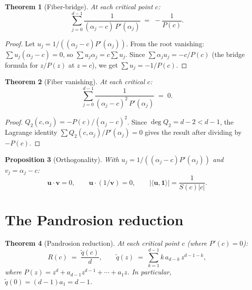 \documentclass[11pt,a4paper]{article}
\newtheorem{theorem}{Theorem}[section]
\newtheorem{proposition}[theorem]{Proposition}
\begin{document}
\begin{theorem}[Fiber-bridge]
At each critical point $c$:
\begin{equation}
\boxed{\sum_{j=0}^{d-1} \frac{1}{(\alpha_j - c)\, P'(\alpha_j)} \;=\; -\frac{1}{P(c)}.}
\end{equation}
\end{theorem}

\begin{proof}
Let $u_j = 1/((\alpha_j - c) P'(\alpha_j))$. From the root vanishing: $\sum u_j (\alpha_j - c) = 0$, so $\sum u_j \alpha_j = c \sum u_j$. Since $\sum \alpha_j u_j = -c/P(c)$ (the bridge formula for $z/P(z)$ at $z = c$), we get $\sum u_j = -1/P(c)$.
\end{proof}

\begin{theorem}[Fiber vanishing]
At each critical $c$:
\begin{equation}
\boxed{\sum_{j=0}^{d-1} \frac{1}{(\alpha_j - c)^2\, P'(\alpha_j)} \;=\; 0.}
\end{equation}
\end{theorem}

\begin{proof}
$Q_2(c, \alpha_j) = -P(c)/(\alpha_j - c)^2$. Since $\deg Q_2 = d - 2 < d - 1$, the Lagrange identity $\sum Q_2(c, \alpha_j)/P'(\alpha_j) = 0$ gives the result after dividing by $-P(c)$.
\end{proof}

\begin{proposition}[Orthogonality]
With $u_j = 1/((\alpha_j - c) P'(\alpha_j))$ and $v_j = \alpha_j - c$:
\begin{equation}
\mathbf{u} \cdot \mathbf{v} = 0, \qquad \mathbf{u} \cdot (1/\mathbf{v}) = 0, \qquad |\langle \mathbf{u}, \mathbf{1} \rangle| = \frac{1}{S(c)|c|}.
\end{equation}
\end{proposition}

\section{The Pandrosion reduction}\label{sec:reduction}

\begin{theorem}[Pandrosion reduction]
At each critical point $c$ (where $P'(c) = 0$):
\begin{equation}
R(c) \;=\; \frac{\tilde q(c)}{d}, \qquad \tilde q(z) \;=\; \sum_{k=1}^{d-1} k\, a_{d-k}\, z^{d-1-k},
\end{equation}
where $P(z) = z^d + a_{d-1} z^{d-1} + \cdots + a_1 z$. In particular, $\tilde q(0) = (d - 1) a_1 = d - 1$.
\end{theorem}
\end{document}
